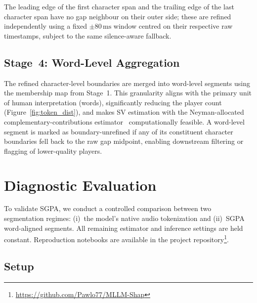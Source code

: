 \documentclass[cameraready]{Interspeech}
\begin{document}
The leading edge of the first character span and the trailing edge of the last character span have no gap neighbour on their outer side; these are refined independently using a fixed $\pm80\,\text{ms}$ window centred on their respective raw timestamps, subject to the same silence-aware fallback.

\subsection{Stage~4: Word-Level Aggregation}

The refined character-level boundaries are merged into word-level segments using the membership map from Stage~1. This granularity aligns with the primary unit of human interpretation (words), significantly reducing the player count (Figure~\ref{fig:token_dist}), and makes SV estimation with the Neyman-allocated complementary-contributions estimator~\cite{shapleyapproximations, nayman} computationally feasible. A word-level segment is marked as boundary-unrefined if any of its constituent character boundaries fell back to the raw gap midpoint, enabling downstream filtering or flagging of lower-quality players.

\section{Diagnostic Evaluation}
\label{sec:experiments}

To validate SGPA, we conduct a controlled comparison between two segmentation regimes: (i)~the model's native audio tokenization and (ii)~SGPA word-aligned segments. All remaining estimator and inference settings are held constant. Reproduction notebooks are available in the project repository\footnote{\url{https://github.com/Pawlo77/MLLM-Shap}}.

\subsection{Setup}
\label{sec:setup}
\end{document}
